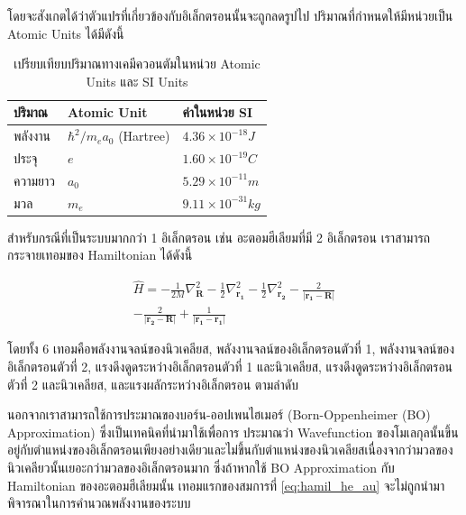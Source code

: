 \noindent โดยจะสังเกตได้ว่าตัวแปรที่เกี่ยวข้องกับอิเล็กตรอนนั้นจะถูกลดรูปไป ปริมาณที่กำหนดให้มีหน่วยเป็น Atomic Units ได้มีดังนี้

\begin{table}[H]
    \centering
    \caption{เปรียบเทียบปริมาณทางเคมีควอนตัมในหน่วย Atomic Units และ SI Units}
    \label{tab:atomic_units}
    \begin{tabular}{lll}\toprule
    \textbf{ปริมาณ} &\textbf{Atomic Unit} &\textbf{ค่าในหน่วย SI} \\\midrule
    พลังงาน & $\hbar^{2}/m_{e}a_{0}$ (Hartree) & $4.36 \times 10^{-18} J$ \\
    ประจุ & $e$ & $1.60 \times 10^{-19} C$ \\
    ความยาว & $a_{0}$ & $5.29 \times 10^{-11} m$ \\
    มวล & $m_{e}$ & $9.11 \times 10^{-31} kg$ \\
    \bottomrule
    \end{tabular}
\end{table}

สำหรับกรณีที่เป็นระบบมากกว่า 1 อิเล็กตรอน เช่น อะตอมฮีเลียมที่มี 2 อิเล็กตรอน เราสามารถกระจายเทอมของ Hamiltonian ได้ดังนี้

\begin{multline}\label{eq:hamil_he_au}
    \hat{H} = -\frac{1}{2M} \nabla^{2}_{\bm{R}} 
              -\frac{1}{2} \nabla^{2}_{\bm{r_{1}}}
              -\frac{1}{2} \nabla^{2}_{\bm{r_{2}}}
              -\frac{2}{|\bm{r_{1}}-\bm{R}|}
              \\
              -\frac{2}{|\bm{r_{2}}-\bm{R}|}
              +\frac{1}{|\bm{r_{1}}-\bm{r_{1}}|}
\end{multline}

\noindent โดยทั้ง 6 เทอมคือพลังงานจลน์ของนิวเคลียส, พลังงานจลน์ของอิเล็กตรอนตัวที่ 1, พลังงานจลน์ของอิเล็กตรอนตัวที่ 2, 
แรงดึงดูดระหว่างอิเล็กตรอนตัวที่ 1 และนิวเคลียส, แรงดึงดูดระหว่างอิเล็กตรอนตัวที่ 2 และนิวเคลียส, และแรงผลักระหว่างอิเล็กตรอน ตามลำดับ 

นอกจากเราสามารถใช้การประมาณของบอร์น-ออปเพนไฮเมอร์ (Born-Oppenheimer (BO) Approximation) ซึ่งเป็นเทคนิคที่นำมาใช้เพื่อการ%
ประมาณว่า Wavefunction ของโมเลกุลนั้นขึ้นอยู่กับตำแหน่งของอิเล็กตรอนเพียงอย่างเดียวและไม่ขึ้นกับตำแหน่งของนิวเคลียสเนื่องจากว่ามวลของ%
นิวเคลียวนั้นเยอะกว่ามวลของอิเล็กตรอนมาก ซึ่งถ้าหากใช้ BO Approximation กับ Hamiltonian ของอะตอมฮีเลียมนั้น เทอมแรกของสมการที่ 
\ref{eq:hamil_he_au} จะไม่ถูกนำมาพิจารณาในการคำนวณพลังงานของระบบ

